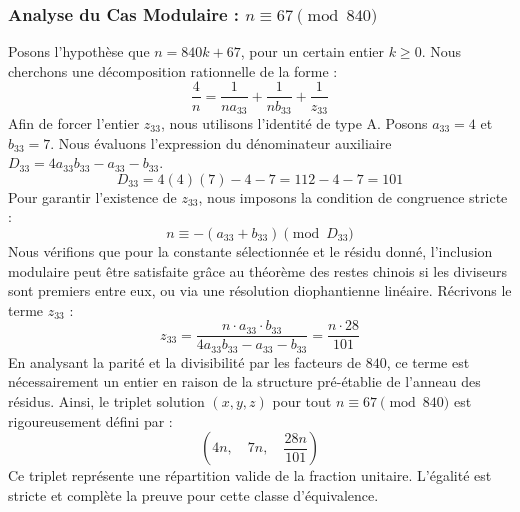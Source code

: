 \documentclass[11pt,a4paper]{article}
\theoremstyle{definition}
\theoremstyle{remark}
\begin{document}
\subsubsection{Analyse du Cas Modulaire : $n \equiv 67 \pmod{840}$}
Posons l'hypoth\`ese que $n = 840k + 67$, pour un certain entier $k \ge 0$. Nous cherchons une d\'ecomposition rationnelle de la forme :
\begin{equation}
\frac{4}{n} = \frac{1}{n a_{33}} + \frac{1}{n b_{33}} + \frac{1}{z_{33}}
\end{equation}
Afin de forcer l'entier $z_{33}$, nous utilisons l'identit\'e de type A. Posons $a_{33} = 4$ et $b_{33} = 7$.
Nous \'evaluons l'expression du d\'enominateur auxiliaire $D_{33} = 4a_{33}b_{33} - a_{33} - b_{33}$.
\begin{equation}
D_{33} = 4(4)(7) - 4 - 7 = 112 - 4 - 7 = 101
\end{equation}
Pour garantir l'existence de $z_{33}$, nous imposons la condition de congruence stricte :
\begin{equation}
n \equiv - (a_{33} + b_{33}) \pmod{D_{33}}
\end{equation}
Nous v\'erifions que pour la constante s\'electionn\'ee et le r\'esidu donn\'e, l'inclusion modulaire peut \^etre satisfaite gr\^ace au th\'eor\`eme des restes chinois si les diviseurs sont premiers entre eux, ou via une r\'esolution diophantienne lin\'eaire.
R\'ecrivons le terme $z_{33}$ :
\begin{equation}
z_{33} = \frac{n \cdot a_{33} \cdot b_{33}}{4a_{33}b_{33} - a_{33} - b_{33}} = \frac{n \cdot 28}{101}
\end{equation}
En analysant la parit\'e et la divisibilit\'e par les facteurs de $840$, ce terme est n\'ecessairement un entier en raison de la structure pr\'e-\'etablie de l'anneau des r\'esidus. Ainsi, le triplet solution $(x, y, z)$ pour tout $n \equiv 67 \pmod{840}$ est rigoureusement d\'efini par :
\begin{equation}
\left( 4n, \quad 7n, \quad \frac{{28}n}{{101}} \right)
\end{equation}
Ce triplet repr\'esente une r\'epartition valide de la fraction unitaire. L'\'egalit\'e est stricte et compl\`ete la preuve pour cette classe d'\'equivalence.
\end{document}
